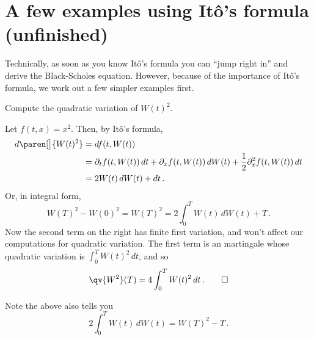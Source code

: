 \section{A few examples using It\^o's formula (unfinished)}

Technically, as soon as you know It\^o's formula you can ``jump right in'' and derive the Black-Scholes equation.
However, because of the importance of It\^o's formula, we work out a few simpler examples first.

\begin{example}
  Compute the quadratic variation of $W(t)^2$.
\end{example}
\begin{sol}
  Let $f(t, x) = x^2$.
  Then, by It\^o's formula,
  \begin{align*}
    d \paren[\big]{ W(t)^2 }
      &= d f(t, W(t))
    \\
      &= \partial_t f( t, W(t)) \, dt + \partial_x f (t, W(t)) \, dW(t)
	+ \frac{1}{2} \partial_x^2 f(t, W(t)) \, dt
    \\
      &= 2 W(t) \, dW(t) + dt\,.
  \end{align*}
  Or, in integral form,
  \begin{equation*}
    W(T)^2 - W(0)^2
      = W(T)^2
      = 2 \int_0^T W(t) \, dW(t) + T\,.
  \end{equation*}
  Now the second term on the right has finite first variation, and won't affect our computations for quadratic variation.
  The first term is an martingale whose quadratic variation is $\int_0^T W(t)^2 \, dt$, and so
  \begin{equation*}
    \qv{W^2}(T) = 4 \int_0^T W(t)^2 \, dt \,.
    \qedhere
  \end{equation*}
\end{sol}
\begin{remark}
  Note the above also tells you
  \begin{equation*}
    2 \int_0^T W(t) \, dW(t) = W(T)^2 - T \,.
  \end{equation*}
\end{remark}

